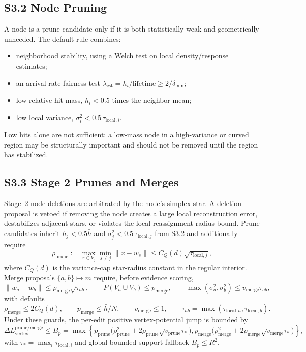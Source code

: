 \documentclass[11pt]{article}
\begin{document}
\subsection*{S3.2 Node Pruning}
A node is a prune candidate only if it is both statistically weak and geometrically unneeded. The default rule combines:
\begin{itemize}[leftmargin=1.5em]
  \item neighborhood stability, using a Welch test on local density/response estimates;
  \item an arrival-rate fairness test $\lambda_{\mathrm{est}}=h_i/\mathrm{lifetime}\ge 2/\delta_{\min}$;
  \item low relative hit mass, $h_i<0.5$ times the neighbor mean;
  \item low local variance, $\sigma_i^2<0.5\,\tau_{\mathrm{local},i}$.
\end{itemize}
Low hits alone are not sufficient: a low-mass node in a high-variance or curved region may be structurally important and should not be removed until the region has stabilized.

\subsection*{S3.3 Stage 2 Prunes and Merges}
Stage~2 node deletions are arbitrated by the node's simplex star. A deletion proposal is vetoed if removing the node creates a large local reconstruction error, destabilizes adjacent stars, or violates the local reassignment radius bound. Prune candidates inherit $h_j<0.5\bar h$ and $\sigma_j^2<0.5\,\tau_{\mathrm{local},j}$ from S3.2 and additionally require
\[
\rho_{\mathrm{prune}}
:=
\max_{x\in V_j}\min_{s\ne j}\|x-w_s\|
\le C_Q(d)\sqrt{\tau_{\mathrm{local},j}},
\]
where $C_Q(d)$ is the variance-cap star-radius constant in the regular interior. Merge proposals $\{a,b\}\mapsto m$ require, before evidence scoring,
\[
\|w_a-w_b\|\le\rho_{\mathrm{merge}}\sqrt{\tau_{ab}},
\qquad
P(V_a\cup V_b)\le p_{\mathrm{merge}},
\qquad
\max(\sigma_a^2,\sigma_b^2)\le v_{\mathrm{merge}}\tau_{ab},
\]
with defaults
\[
\rho_{\mathrm{merge}}\le 2C_Q(d),\qquad
p_{\mathrm{merge}}\le \bar h/N,\qquad
v_{\mathrm{merge}}\le 1,\qquad
\tau_{ab}=\max(\tau_{\mathrm{local},a},\tau_{\mathrm{local},b}).
\]
Under these guards, the per-edit positive vertex-potential jump is bounded by
\[
\Delta L_{\mathrm{vertex}}^{\mathrm{prune/merge}}
\le
B_p
=
\max\!\left\{
p_{\mathrm{prune}}\bigl(\rho_{\mathrm{prune}}^2
+2\rho_{\mathrm{prune}}\sqrt{v_{\mathrm{prune}}\tau_*}\bigr),
p_{\mathrm{merge}}\bigl(\rho_{\mathrm{merge}}^2
+2\rho_{\mathrm{merge}}\sqrt{v_{\mathrm{merge}}\tau_*}\bigr)
\right\},
\label{eq:si-bp-jump}
\]
with $\tau_*=\max_i\tau_{\mathrm{local},i}$ and global bounded-support fallback $B_p\le R^2$.
\end{document}
